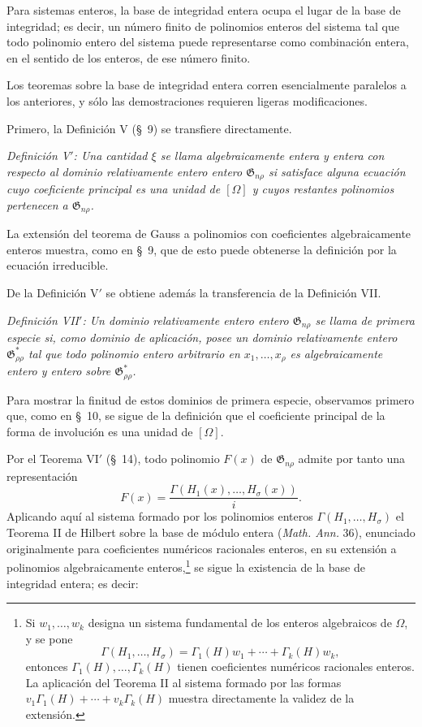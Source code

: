 \documentclass[11pt]{article}
\providecommand{\Gdom}{\mathfrak{G}}
\begin{document}
Para sistemas enteros, la base de integridad entera ocupa el lugar de la base de integridad; es decir, un número finito de polinomios enteros del sistema tal que todo polinomio entero del sistema puede representarse como combinación entera, en el sentido de los enteros, de ese número finito.

Los teoremas sobre la base de integridad entera corren esencialmente paralelos a los anteriores, y sólo las demostraciones requieren ligeras modificaciones.

Primero, la Definición V (\S\ 9) se transfiere directamente.

\emph{Definición V$'$: Una cantidad $\xi$ se llama algebraicamente entera y entera con respecto al dominio relativamente entero entero $\Gdom_{n\rho}$ si satisface alguna ecuación cuyo coeficiente principal es una unidad de $[\Omega]$ y cuyos restantes polinomios pertenecen a $\Gdom_{n\rho}$.}

La extensión del teorema de Gauss a polinomios con coeficientes algebraicamente enteros muestra, como en \S\ 9, que de esto puede obtenerse la definición por la ecuación irreducible.

De la Definición V$'$ se obtiene además la transferencia de la Definición VII.

\emph{Definición VII$'$: Un dominio relativamente entero entero $\Gdom_{n\rho}$ se llama de primera especie si, como dominio de aplicación, posee un dominio relativamente entero $\Gdom^*_{\rho\rho}$ tal que todo polinomio entero arbitrario en $x_1,\ldots,x_\rho$ es algebraicamente entero y entero sobre $\Gdom^*_{\rho\rho}$.}

Para mostrar la finitud de estos dominios de primera especie, observamos primero que, como en \S\ 10, se sigue de la definición que el coeficiente principal de la forma de involución es una unidad de $[\Omega]$.

Por el Teorema VI$'$ (\S\ 14), todo polinomio $F(x)$ de $\Gdom_{n\rho}$ admite por tanto una representación
\[
  F(x)=\frac{\Gamma(H_1(x),\ldots,H_\sigma(x))}{i}.
\]
Aplicando aquí al sistema formado por los polinomios enteros $\Gamma(H_1,\ldots,H_\sigma)$ el Teorema II de Hilbert sobre la base de módulo entera (\emph{Math. Ann.} 36), enunciado originalmente para coeficientes numéricos racionales enteros, en su extensión a polinomios algebraicamente enteros,\footnote{Si $w_1,\ldots,w_k$ designa un sistema fundamental de los enteros algebraicos de $\Omega$, y se pone
\[
  \Gamma(H_1,
\ldots,H_\sigma)=\Gamma_1(H)w_1+\cdots+\Gamma_k(H)w_k,
\]
entonces $\Gamma_1(H),\ldots,\Gamma_k(H)$ tienen coeficientes numéricos racionales enteros. La aplicación del Teorema II al sistema formado por las formas $v_1\Gamma_1(H)+\cdots+v_k\Gamma_k(H)$ muestra directamente la validez de la extensión.} se sigue la existencia de la base de integridad entera; es decir:
\end{document}
